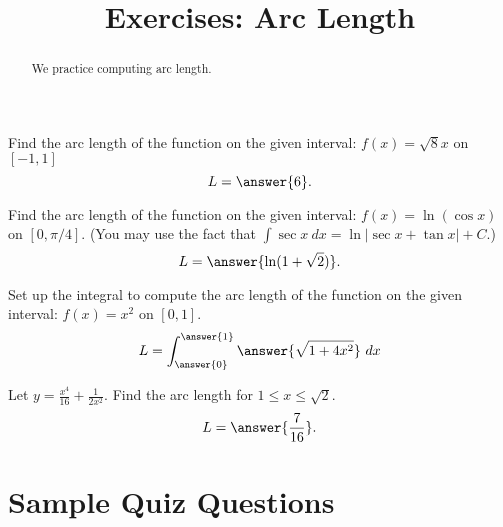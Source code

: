 \documentclass{ximera}
\title{Exercises: Arc Length}
\begin{document}
\begin{abstract}
We practice computing arc length.
\end{abstract}
\maketitle

\begin{exercise}%
Find the arc length of the function on the given interval: \(\displaystyle f(x) = \sqrt{8}x\) on \([-1, 1]\)
\[ L = \answer{6}. \]
\end{exercise}

\begin{exercise}
Find the arc length of the function on the given interval: \(\displaystyle f(x) = \ln \left(\cos x\right)\) on \([0, \pi/4]\).
(You may use the fact that $\int \sec x ~ dx = \ln |\sec x + \tan x| + C$.)
\[ L = \answer{\ln (1 + \sqrt{2})}. \]
\end{exercise}

\begin{exercise}%
Set up the integral to compute the arc length of the function on the given interval: \(\displaystyle f(x) = x^2\) on \([0, 1]\).
\[ L = \int_{\answer{0}}^{\answer{1}} \answer{\sqrt{1+4x^2}} \ dx\]
%
%
\end{exercise}

\begin{question}%
Let \(\displaystyle y = \frac{x^4}{16} + \frac{1}{2x^2}\). Find the arc length for \(1 \leq x \leq \sqrt{2}\).
\[ L = \answer{\frac{7}{16}}. \]
\end{question}

\section*{Sample Quiz Questions}
\end{document}
